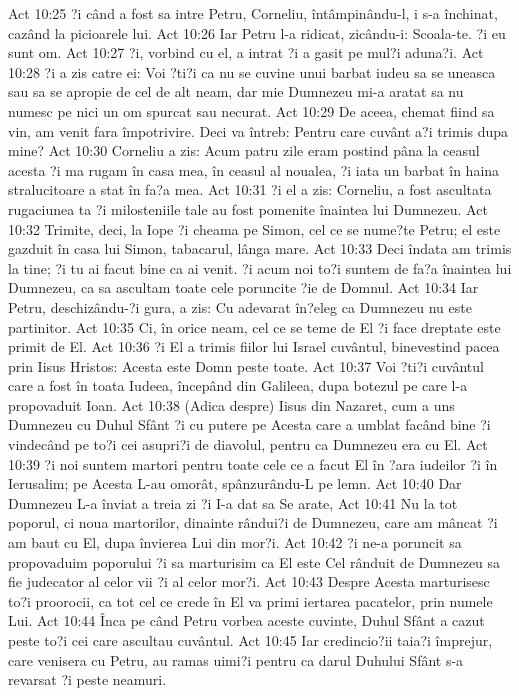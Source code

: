 Act 10:25  ?i când a fost sa intre Petru, Corneliu, întâmpinându-l, i s-a închinat, cazând la picioarele lui.
Act 10:26  Iar Petru l-a ridicat, zicându-i: Scoala-te. ?i eu sunt om.
Act 10:27  ?i, vorbind cu el, a intrat ?i a gasit pe mul?i aduna?i.
Act 10:28  ?i a zis catre ei: Voi ?ti?i ca nu se cuvine unui barbat iudeu sa se uneasca sau sa se apropie de cel de alt neam, dar mie Dumnezeu mi-a aratat sa nu numesc pe nici un om spurcat sau necurat.
Act 10:29  De aceea, chemat fiind sa vin, am venit fara împotrivire. Deci va întreb: Pentru care cuvânt a?i trimis dupa mine?
Act 10:30  Corneliu a zis: Acum patru zile eram postind pâna la ceasul acesta ?i ma rugam în casa mea, în ceasul al noualea, ?i iata un barbat în haina stralucitoare a stat în fa?a mea.
Act 10:31  ?i el a zis: Corneliu, a fost ascultata rugaciunea ta ?i milosteniile tale au fost pomenite înaintea lui Dumnezeu.
Act 10:32  Trimite, deci, la Iope ?i cheama pe Simon, cel ce se nume?te Petru; el este gazduit în casa lui Simon, tabacarul, lânga mare.
Act 10:33  Deci îndata am trimis la tine; ?i tu ai facut bine ca ai venit. ?i acum noi to?i suntem de fa?a înaintea lui Dumnezeu, ca sa ascultam toate cele poruncite ?ie de Domnul.
Act 10:34  Iar Petru, deschizându-?i gura, a zis: Cu adevarat în?eleg ca Dumnezeu nu este partinitor.
Act 10:35  Ci, în orice neam, cel ce se teme de El ?i face dreptate este primit de El.
Act 10:36  ?i El a trimis fiilor lui Israel cuvântul, binevestind pacea prin Iisus Hristos: Acesta este Domn peste toate.
Act 10:37  Voi ?ti?i cuvântul care a fost în toata Iudeea, începând din Galileea, dupa botezul pe care l-a propovaduit Ioan.
Act 10:38  (Adica despre) Iisus din Nazaret, cum a uns Dumnezeu cu Duhul Sfânt ?i cu putere pe Acesta care a umblat facând bine ?i vindecând pe to?i cei asupri?i de diavolul, pentru ca Dumnezeu era cu El.
Act 10:39  ?i noi suntem martori pentru toate cele ce a facut El în ?ara iudeilor ?i în Ierusalim; pe Acesta L-au omorât, spânzurându-L pe lemn.
Act 10:40  Dar Dumnezeu L-a înviat a treia zi ?i I-a dat sa Se arate,
Act 10:41  Nu la tot poporul, ci noua martorilor, dinainte rândui?i de Dumnezeu, care am mâncat ?i am baut cu El, dupa învierea Lui din mor?i.
Act 10:42  ?i ne-a poruncit sa propovaduim poporului ?i sa marturisim ca El este Cel rânduit de Dumnezeu sa fie judecator al celor vii ?i al celor mor?i.
Act 10:43  Despre Acesta marturisesc to?i proorocii, ca tot cel ce crede în El va primi iertarea pacatelor, prin numele Lui.
Act 10:44  Înca pe când Petru vorbea aceste cuvinte, Duhul Sfânt a cazut peste to?i cei care ascultau cuvântul.
Act 10:45  Iar credincio?ii taia?i împrejur, care venisera cu Petru, au ramas uimi?i pentru ca darul Duhului Sfânt s-a revarsat ?i peste neamuri.
